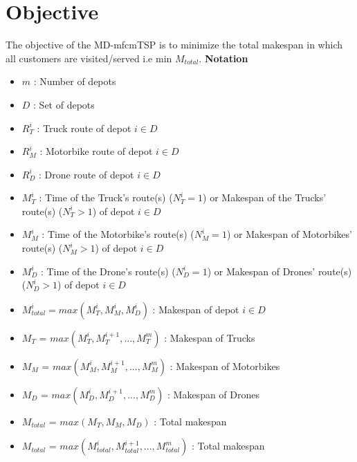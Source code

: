 \documentclass{article}
\begin{document}
	\section{Objective}
	The objective of the MD-mfcmTSP is to minimize the total makespan in which all customers are visited/served i.e min $M_{total}$.\;
	\newline
	\newline
	\textbf{Notation}\;
	\begin{itemize}
		\item $m$ : Number of depots
		\item $D$ : Set of depots
		\item $R_T^i$ : Truck route of depot $i\in D$ \;
		\item $R_M^i$ : Motorbike route of depot $i\in D$ \;
		\item $R_D^i$ : Drone route of depot $i\in D$ \;
		\item $M_T^i$ : Time of the Truck's route(s) ($N^i_{T}=1$) or Makespan of the Trucks' route(s) ($N^i_{T}>1$) of depot $i\in D$ \;
		\item $M_M^i$ : Time of the Motorbike's route(s) ($N^i_{M}=1$) or Makespan of Motorbikes' route(s) ($N^i_{M}>1$) of depot $i\in D$ \;
		\item $M_D^i$ : Time of the Drone's route(s) ($N^i_{D}=1$) or Makespan of Drones' route(s) ($N^i_{D}>1$) of depot $i\in D$ \;
		\item $M^i_{total}=max(M_T^i,M_M^i,M_D^i)$ : Makespan of depot $i\in D$\; 
		\item $M_T$ = $max(M_T^i, M_T^{i+1}, ..., M_T^m)$ : Makespan of Trucks \;
		\item $M_M$ = $max(M_M^i, M_M^{i+1}, ..., M_M^m)$ : Makespan of Motorbikes \;
		\item $M_D$ = $max(M_D^i, M_D^{i+1}, ..., M_D^m)$ : Makespan of Drones \;
		\item $M_{total}$ = $max(M_T, M_M, M_D)$ : Total makespan \;
		\item $M_{total}$ = $max(M_{total}^i, M_{total}^{i+1}, ..., M_{total}^m)$ : Total makespan\;
	\end{itemize}
	
	\newpage
\end{document}
